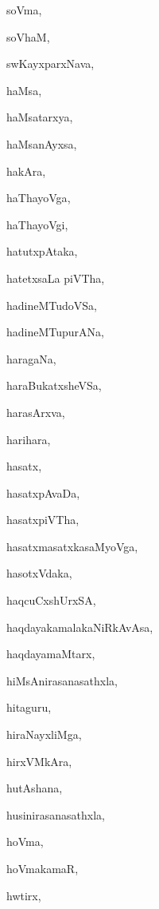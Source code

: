 \begin{multicols}{3}
{\noindent
{soVma}, \pageref{soVma}

\noindent
{soVhaM}, \pageref{soVhaM}

\noindent
{swKayxparxNava}, \pageref{swKayxparxNava}

\noindent
{haMsa}, \pageref{haMsa}

\noindent
{haMsatarxya}, \pageref{haMsatarxya}

\noindent
{haMsanAyxsa}, \pageref{haMsanAyxsa}

\noindent
{hakAra}, \pageref{hakAra}

\noindent
{haThayoVga}, \pageref{haThayoVga}

\noindent
{haThayoVgi}, \pageref{haThayoVgi}

\noindent
{hatutxpAtaka}, \pageref{hatutxpAtaka}

\noindent
{hatetxsaLa piVTha}, \pageref{hatetxsaLapiVTha}

\noindent
{hadineMTudoVSa}, \pageref{hadineMTudoVSa}

\noindent
{hadineMTupurANa}, \pageref{hadineMTupurANa}

\noindent
{haragaNa}, \pageref{haragaNa}

\noindent
{haraBukatxsheVSa}, \pageref{haraBukatxsheVSa}

\noindent
{harasArxva}, \pageref{harasArxva}

\noindent
{harihara}, \pageref{harihara}

\noindent
{hasatx}, \pageref{hasatx}

\noindent
{hasatxpAvaDa}, \pageref{hasatxpAvaDa}

\noindent
{hasatxpiVTha}, \pageref{hasatxpiVTha}

\noindent
{hasatxmasatxkasaMyoVga}, \pageref{hasatxmasatxkasaMyoVga}

\noindent
{hasotxVdaka}, \pageref{hasotxVdaka}

\noindent
{haqcuCxshUrxSA}, \pageref{haqcuCxshUrxSA}

\noindent
{haqdayakamalakaNiRkAvAsa}, \pageref{haqdayakamalakaNiRkAvAsa}

\noindent
{haqdayamaMtarx}, \pageref{haqdayamaMtarx}

\noindent
{hiMsAnirasanasathxla}, \pageref{hiMsAnirasanasathxla}

\noindent
{hitaguru}, \pageref{hitaguru}

\noindent
{hiraNayxliMga}, \pageref{hiraNayxliMga}

\noindent
{hirxVMkAra}, \pageref{hirxVMkAra}

\noindent
{hutAshana}, \pageref{hutAshana}

\noindent
{husinirasanasathxla}, \pageref{husinirasanasathxla}

\noindent
{hoVma}, \pageref{hoVma}

\noindent
{hoVmakamaR}, \pageref{hoVmakamaR}

\noindent
{hwtirx}, \pageref{hwtirx}
}
\end{multicols}

